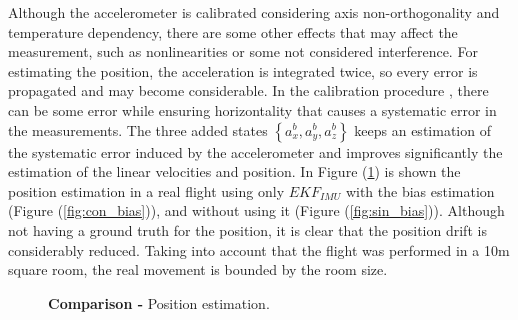 \documentclass[conference]{IEEEtran}
\newcommand{\refp}[1]{(\ref{#1})}
\begin{document}
Although the accelerometer is calibrated considering axis non-orthogonality and temperature dependency, there are some other effects that may affect the measurement, such as nonlinearities or some not considered interference. For estimating the position, the acceleration is integrated twice, so every error is propagated and may become considerable. In the calibration procedure \cite{bib:nosotros}, there can be some error while ensuring horizontality that causes a systematic error in the measurements. The three added states $\left\lbrace a_x^b,a_y^b,a_z^b\right\rbrace$ keeps an estimation of the systematic error induced by the accelerometer and improves significantly the estimation of the linear velocities and position. In Figure \refp{fig:efecto_bias} is shown the position estimation in a real flight using only $EKF_{IMU}$ with the bias estimation (Figure \refp{fig:con_bias}), and without using it (Figure \refp{fig:sin_bias}). Although not having a ground truth for the position, it is clear that the position drift is considerably reduced. Taking into account that the flight was performed in a 10m square room, the real movement is bounded by the room size.
\begin{figure}
  \centering
   \hspace*{-5pt}
  \caption{\textbf{Comparison -} Position estimation.}
  \label{fig:efecto_bias}
  \vspace{-0.5cm}
\end{figure}
\end{document}
